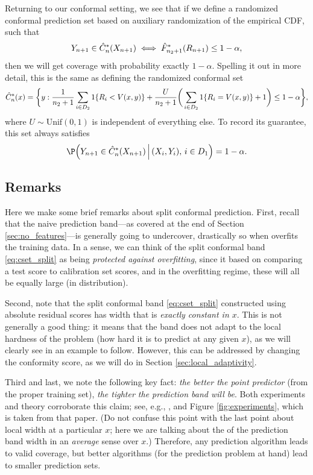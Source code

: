 \documentclass{article}
\begin{document}
Returning to our conformal setting, we see that if we define a randomized
conformal prediction set based on auxiliary randomization of the empirical CDF, 
such that  
\[
Y_{n+1} \in \hat{C}_n^*(X_{n+1}) \iff \hat{F}_{n_2+1}^*(R_{n+1}) \leq 1-\alpha,
\] 
then we will get coverage with probability exactly $1-\alpha$. Spelling it out
in more detail, this is the same as defining the randomized conformal set 
\[
\hat{C}_n^*(x) = \bigg\{ y : \frac{1}{n_2+1} \sum_{i \in D_2} 1\{ R_i < V(x,y) \} 
+ \frac{U}{n_2+1} \bigg( \sum_{i \in D_2} 1\{ R_i = V(x,y) \} + 1 \bigg)
\leq 1-\alpha \bigg\},
\]
where $U \sim \mathrm{Unif}(0,1)$ is independent of everything else. To record
its guarantee, this set always satisfies  
\[
\P\Big( Y_{n+1} \in \hC_n^*(X_{n+1}) \, \Big| \, (X_i,Y_i), \, i \in D_1 \Big) = 
1-\alpha. 
\]

\subsection{Remarks}

Here we make some brief remarks about split conformal prediction. First, recall
that the naive prediction band---as covered at the end of Section
\ref{sec:no_features}---is generally going to undercover, drastically so when
 overfits the training data. In a sense, we can think of the 
split conformal band \eqref{eq:cset_split} as being \emph{protected against
  overfitting}, since it based on comparing a test score to calibration set
scores, and in the overfitting regime, these will all be equally large (in
distribution).   

Second, note that the split conformal band \eqref{eq:cset_split} constructed
using absolute residual scores has width that is \emph{exactly constant in
  $x$}. This is not generally a good thing: it means that the band does not
adapt to the local hardness of the problem (how hard it is to predict at any
given $x$), as we will clearly see in an example to follow. However, this can be
addressed by changing the conformity score, as we will do in Section
\ref{sec:local_adaptivity}.    

Third and last, we note the following key fact: \emph{the better the point
  predictor } (from the proper training set), \emph{the
  tighter the prediction band will be}. Both experiments and theory corroborate
this claim; see, e.g., \citet{lei2018distribution}, and Figure
\ref{fig:experiments}, which is taken from that paper. (Do not confuse this
point with the last point about local width at a particular $x$; here we are
talking about the of the prediction band width in an \emph{average} sense over
$x$.) Therefore, any prediction algorithm leads to valid coverage, but better
algorithms (for the prediction problem at hand) lead to smaller prediction
sets. 
\end{document}
